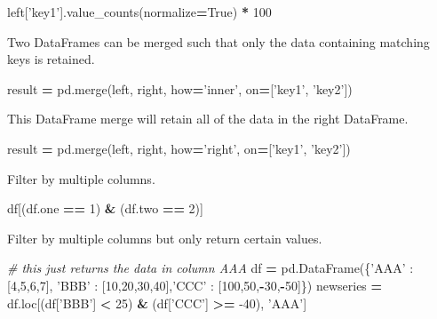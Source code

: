 \documentclass[]{book}
\newenvironment{Shaded}{\begin{snugshade}}{\end{snugshade}}
\newcommand{\CommentTok}[1]{\textcolor[rgb]{0.56,0.35,0.01}{\textit{#1}}}
\newcommand{\DecValTok}[1]{\textcolor[rgb]{0.00,0.00,0.81}{#1}}
\newcommand{\NormalTok}[1]{#1}
\newcommand{\OperatorTok}[1]{\textcolor[rgb]{0.81,0.36,0.00}{\textbf{#1}}}
\newcommand{\StringTok}[1]{\textcolor[rgb]{0.31,0.60,0.02}{#1}}
\newcommand{\VariableTok}[1]{\textcolor[rgb]{0.00,0.00,0.00}{#1}}
\begin{document}
\begin{Shaded}
\begin{Highlighting}[]
\NormalTok{left[}\StringTok{'key1'}\NormalTok{].value_counts(normalize}\OperatorTok{=}\VariableTok{True}\NormalTok{) }\OperatorTok{*} \DecValTok{100}
\end{Highlighting}
\end{Shaded}

Two DataFrames can be merged such that only the data containing matching keys is retained.

\begin{Shaded}
\begin{Highlighting}[]
\NormalTok{result }\OperatorTok{=}\NormalTok{ pd.merge(left, right, how}\OperatorTok{=}\StringTok{'inner'}\NormalTok{, on}\OperatorTok{=}\NormalTok{[}\StringTok{'key1'}\NormalTok{, }\StringTok{'key2'}\NormalTok{])}
\end{Highlighting}
\end{Shaded}

This DataFrame merge will retain all of the data in the right DataFrame.

\begin{Shaded}
\begin{Highlighting}[]
\NormalTok{result }\OperatorTok{=}\NormalTok{ pd.merge(left, right, how}\OperatorTok{=}\StringTok{'right'}\NormalTok{, on}\OperatorTok{=}\NormalTok{[}\StringTok{'key1'}\NormalTok{, }\StringTok{'key2'}\NormalTok{])}
\end{Highlighting}
\end{Shaded}

Filter by multiple columns.

\begin{Shaded}
\begin{Highlighting}[]
\NormalTok{df[(df.one }\OperatorTok{==} \DecValTok{1}\NormalTok{) }\OperatorTok{&}\NormalTok{ (df.two }\OperatorTok{==} \DecValTok{2}\NormalTok{)]}
\end{Highlighting}
\end{Shaded}

Filter by multiple columns but only return certain values.

\begin{Shaded}
\begin{Highlighting}[]
\CommentTok{# this just returns the data in column AAA}
\NormalTok{df }\OperatorTok{=}\NormalTok{ pd.DataFrame(\{}\StringTok{'AAA'}\NormalTok{ : [}\DecValTok{4}\NormalTok{,}\DecValTok{5}\NormalTok{,}\DecValTok{6}\NormalTok{,}\DecValTok{7}\NormalTok{], }\StringTok{'BBB'}\NormalTok{ : [}\DecValTok{10}\NormalTok{,}\DecValTok{20}\NormalTok{,}\DecValTok{30}\NormalTok{,}\DecValTok{40}\NormalTok{],}\StringTok{'CCC'}\NormalTok{ : [}\DecValTok{100}\NormalTok{,}\DecValTok{50}\NormalTok{,}\OperatorTok{-}\DecValTok{30}\NormalTok{,}\OperatorTok{-}\DecValTok{50}\NormalTok{]\})}
\NormalTok{newseries }\OperatorTok{=}\NormalTok{ df.loc[(df[}\StringTok{'BBB'}\NormalTok{] }\OperatorTok{<} \DecValTok{25}\NormalTok{) }\OperatorTok{&}\NormalTok{ (df[}\StringTok{'CCC'}\NormalTok{] }\OperatorTok{>=} \DecValTok{-40}\NormalTok{), }\StringTok{'AAA'}\NormalTok{]}
\end{Highlighting}
\end{Shaded}
\end{document}
